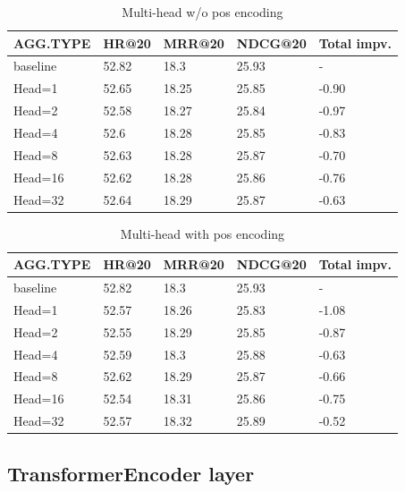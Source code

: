 \documentclass{article}
\begin{document}
\begin{table}
    \caption{Multi-head w/o pos encoding}
    \label{Multi-head w/o pos encoding}
    \centering
    \begin{tabular}{lllll}
        \toprule
        AGG.TYPE & HR@20 & MRR@20 & NDCG@20 & Total impv. \\
        \midrule
        baseline & 52.82 & 18.3   & 25.93   & -           \\
        Head=1   & 52.65 & 18.25  & 25.85   & -0.90       \\
        Head=2   & 52.58 & 18.27  & 25.84   & -0.97       \\
        Head=4   & 52.6  & 18.28  & 25.85   & -0.83       \\
        Head=8   & 52.63 & 18.28  & 25.87   & -0.70       \\
        Head=16  & 52.62 & 18.28  & 25.86   & -0.76       \\
        Head=32  & 52.64 & 18.29  & 25.87   & -0.63       \\
        \bottomrule
    \end{tabular}
\end{table}

\begin{table}
    \caption{Multi-head with pos encoding}
    \label{Multi-head with pos encoding}
    \centering
    \begin{tabular}{lllll}
        \toprule
        AGG.TYPE & HR@20 & MRR@20 & NDCG@20 & Total impv. \\
        \midrule
        baseline & 52.82 & 18.3   & 25.93   & -           \\
        Head=1   & 52.57 & 18.26  & 25.83   & -1.08       \\
        Head=2   & 52.55 & 18.29  & 25.85   & -0.87       \\
        Head=4   & 52.59 & 18.3   & 25.88   & -0.63       \\
        Head=8   & 52.62 & 18.29  & 25.87   & -0.66       \\
        Head=16  & 52.54 & 18.31  & 25.86   & -0.75       \\
        Head=32  & 52.57 & 18.32  & 25.89   & -0.52       \\
        \bottomrule
    \end{tabular}
\end{table}

\subsection{TransformerEncoder layer}
\end{document}
